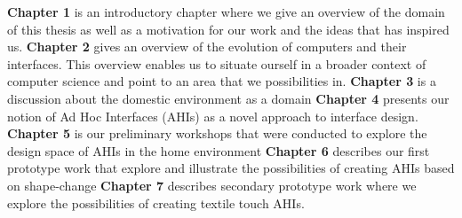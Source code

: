 \textbf{Chapter 1} is an introductory chapter where we give an overview of the domain of this thesis as well as a motivation for our work and the ideas that has inspired us.
\blank
\textbf{Chapter 2} gives an overview of the evolution of computers and their interfaces.
This overview enables us to situate ourself in a broader context of computer science and point to an area that we possibilities in.  
\blank
\textbf{Chapter 3} is a discussion about the domestic environment as a domain 
\blank
\textbf{Chapter 4} presents our notion of Ad Hoc Interfaces (AHIs) as a novel approach to interface design.  
\blank
\textbf{Chapter 5} is our preliminary workshops that were conducted to explore the design space of AHIs in the home environment
\blank
\textbf{Chapter 6} describes our first prototype work that explore and illustrate the possibilities of creating AHIs based on shape-change
\blank
\textbf{Chapter 7} describes secondary prototype work where we explore the possibilities of creating textile touch AHIs.